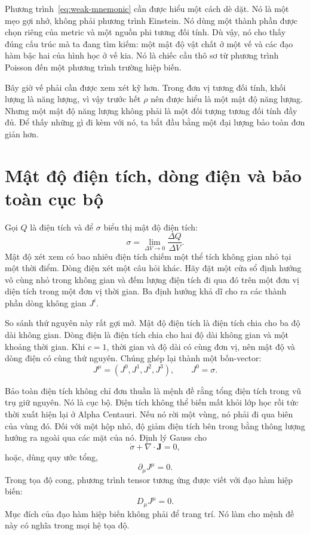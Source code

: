 Phương trình~\eqref{eq:weak-mnemonic} cần được hiểu một cách dè dặt. Nó là một mẹo gợi nhớ, không phải phương trình Einstein. Nó dùng một thành phần được chọn riêng của metric và một nguồn phi tương đối tính. Dù vậy, nó cho thấy đúng cấu trúc mà ta đang tìm kiếm: một mật độ vật chất ở một vế và các đạo hàm bậc hai của hình học ở vế kia. Nó là chiếc cầu thô sơ từ phương trình Poisson đến một phương trình trường hiệp biến.

Bây giờ vế phải cần được xem xét kỹ hơn. Trong đơn vị tương đối tính, khối lượng là năng lượng, vì vậy trước hết \(\rho\) nên được hiểu là một mật độ năng lượng. Nhưng một mật độ năng lượng không phải là một đối tượng tương đối tính đầy đủ. Để thấy những gì đi kèm với nó, ta bắt đầu bằng một đại lượng bảo toàn đơn giản hơn.

\section{Mật độ điện tích, dòng điện và bảo toàn cục bộ}

Gọi \(Q\) là điện tích và để \(\sigma\) biểu thị mật độ điện tích:
\begin{equation}
 \sigma=\lim_{\Delta V\to0}\frac{\Delta Q}{\Delta V}.
\end{equation}
Mật độ xét xem có bao nhiêu điện tích chiếm một thể tích không gian nhỏ tại một thời điểm. Dòng điện xét một câu hỏi khác. Hãy đặt một cửa sổ định hướng vô cùng nhỏ trong không gian và đếm lượng điện tích đi qua đó trên một đơn vị diện tích trong một đơn vị thời gian. Ba định hướng khả dĩ cho ra các thành phần dòng không gian \(J^i\).

So sánh thứ nguyên này rất gợi mở. Mật độ điện tích là điện tích chia cho ba độ dài không gian. Dòng điện là điện tích chia cho hai độ dài không gian và một khoảng thời gian. Khi \(c=1\), thời gian và độ dài có cùng đơn vị, nên mật độ và dòng điện có cùng thứ nguyên. Chúng ghép lại thành một bốn-vector:
\begin{equation}
 J^\mu=(J^0,J^1,J^2,J^3),
 \qquad J^0=\sigma.
\end{equation}

Bảo toàn điện tích không chỉ đơn thuần là mệnh đề rằng tổng điện tích trong vũ trụ giữ nguyên. Nó là cục bộ. Điện tích không thể biến mất khỏi lớp học rồi tức thời xuất hiện lại ở Alpha Centauri. Nếu nó rời một vùng, nó phải đi qua biên của vùng đó. Đối với một hộp nhỏ, độ giảm điện tích bên trong bằng thông lượng hướng ra ngoài qua các mặt của nó. Định lý Gauss cho
\begin{equation}
 \dot{\sigma}+\nabla\cdot\mathbf{J}=0,
\end{equation}
hoặc, dùng quy ước tổng,
\begin{equation}
 \partial_\mu J^\mu=0.
 \label{eq:charge-continuity}
\end{equation}
Trong tọa độ cong, phương trình tensor tương ứng được viết với đạo hàm hiệp biến:
\begin{equation}
 D_\mu J^\mu=0.
\end{equation}
Mục đích của đạo hàm hiệp biến không phải để trang trí. Nó làm cho mệnh đề này có nghĩa trong mọi hệ tọa độ.

